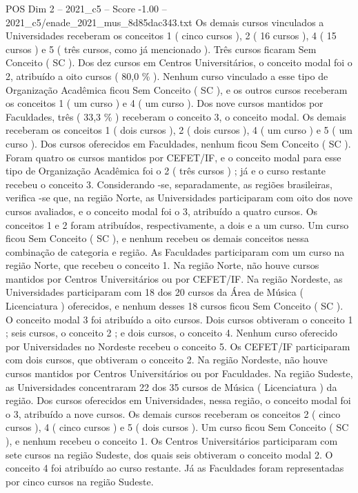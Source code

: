 \begin{textsample}{POS Dim 2 – 2021\_c5 – Score -1.00 – 2021\_c5/enade\_2021\_mus\_8d85dac343.txt}
Os demais cursos vinculados a Universidades receberam os conceitos 1 ( cinco cursos ), 2 ( 16 cursos ), 4 ( 15 cursos ) e 5 ( três cursos, como já mencionado ).
Três cursos ficaram Sem Conceito ( SC ).
Dos dez cursos em Centros Universitários, o conceito modal foi o 2, atribuído a oito cursos ( 80,0 \% ).
Nenhum curso vinculado a esse tipo de Organização Acadêmica ficou Sem Conceito ( SC ), e os outros cursos receberam os conceitos 1 ( um curso ) e 4 ( um curso ).
Dos nove cursos mantidos por Faculdades, três ( 33,3 \% ) receberam o conceito 3, o conceito modal.
Os demais receberam os conceitos 1 ( dois cursos ), 2 ( dois cursos ), 4 ( um curso ) e 5 ( um curso ).
Dos cursos oferecidos em Faculdades, nenhum ficou Sem Conceito ( SC ).
Foram quatro os cursos mantidos por CEFET/IF, e o conceito modal para esse tipo de Organização Acadêmica foi o 2 ( três cursos ) ; já e o curso restante recebeu o conceito 3.
Considerando -se, separadamente, as regiões brasileiras, verifica -se que, na região Norte, as Universidades participaram com oito dos nove cursos avaliados, e o conceito modal foi o 3, atribuído a quatro cursos.
Os conceitos 1 e 2 foram atribuídos, respectivamente, a dois e a um curso.
Um curso ficou Sem Conceito ( SC ), e nenhum recebeu os demais conceitos nessa combinação de categoria e região.
As Faculdades participaram com um curso na região Norte, que recebeu o conceito 1.
Na região Norte, não houve cursos mantidos por Centros Universitários ou por CEFET/IF.
Na região Nordeste, as Universidades participaram com 18 dos 20 cursos da Área de Música ( Licenciatura ) oferecidos, e nenhum desses 18 cursos ficou Sem Conceito ( SC ).
O conceito modal 3 foi atribuído a oito cursos.
Dois cursos obtiveram o conceito 1 ; seis cursos, o conceito 2 ; e dois cursos, o conceito 4.
Nenhum curso oferecido por Universidades no Nordeste recebeu o conceito 5.
Os CEFET/IF participaram com dois cursos, que obtiveram o conceito 2.
Na região Nordeste, não houve cursos mantidos por Centros Universitários ou por Faculdades.
Na região Sudeste, as Universidades concentraram 22 dos 35 cursos de Música ( Licenciatura ) da região.
Dos cursos oferecidos em Universidades, nessa região, o conceito modal foi o 3, atribuído a nove cursos.
Os demais cursos receberam os conceitos 2 ( cinco cursos ), 4 ( cinco cursos ) e 5 ( dois cursos ).
Um curso ficou Sem Conceito ( SC ), e nenhum recebeu o conceito 1.
Os Centros Universitários participaram com sete cursos na região Sudeste, dos quais seis obtiveram o conceito modal 2.
O conceito 4 foi atribuído ao curso restante.
Já as Faculdades foram representadas por cinco cursos na região Sudeste.

\end{textsample}

